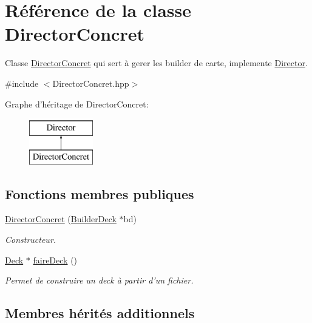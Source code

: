 \hypertarget{class_director_concret}{\section{Référence de la classe Director\-Concret}
\label{class_director_concret}
}


Classe \hyperlink{class_director_concret}{Director\-Concret} qui sert à gerer les builder de carte, implemente \hyperlink{class_director}{Director}.  




{\ttfamily \#include $<$Director\-Concret.\-hpp$>$}

Graphe d'héritage de Director\-Concret\-:\begin{figure}[H]
\begin{center}
\leavevmode
\includegraphics[height=2.000000cm]{class_director_concret}
\end{center}
\end{figure}
\subsection*{Fonctions membres publiques}
\begin{DoxyCompactItemize}
\item 
\hyperlink{class_director_concret_a08b1584ddf77a3b262458f144e23b699}{Director\-Concret} (\hyperlink{class_builder_deck}{Builder\-Deck} $\ast$bd)
\begin{DoxyCompactList}\small\item\em Constructeur. \end{DoxyCompactList}\item 
\hyperlink{class_deck}{Deck} $\ast$ \hyperlink{class_director_concret_a282099b6194ce102102b780a5b4bcb46}{faire\-Deck} ()
\begin{DoxyCompactList}\small\item\em Permet de construire un deck à partir d'un fichier. \end{DoxyCompactList}\end{DoxyCompactItemize}
\subsection*{Membres hérités additionnels}


